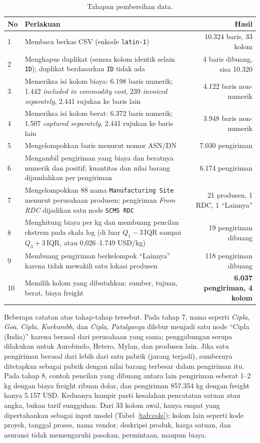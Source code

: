\documentclass[a4paper,11pt]{article}
\begin{document}
\begin{table}[tbp]
\centering\footnotesize
\caption{Tahapan pembersihan data.}\label{tab:clean}
\begin{tabular}{p{}p{}r}
\toprule
No & Perlakuan & Hasil \\ \midrule
1 & Membaca berkas CSV (enkode \texttt{latin-1}) & 10.324 baris, 33 kolom \\
2 & Menghapus duplikat (semua kolom identik selain \texttt{ID}); duplikat berdasarkan \texttt{ID} tidak ada & 4 baris dibuang, sisa 10.320 \\
3 & Memeriksa isi kolom biaya: 6.198 baris numerik; 1.442 \textit{included in commodity cost}, 239 \textit{invoiced separately}, 2.441 rujukan ke baris lain & 4.122 baris non-numerik \\
4 & Memeriksa isi kolom berat: 6.372 baris numerik; 1.507 \textit{captured separately}, 2.441 rujukan ke baris lain & 3.948 baris non-numerik \\
5 & Mengelompokkan baris menurut nomor ASN/DN & 7.030 pengiriman \\
6 & Mengambil pengiriman yang biaya dan beratnya numerik dan positif; kuantitas dan nilai barang dijumlahkan per pengiriman & 6.174 pengiriman \\
7 & Mengelompokkan 88 nama \texttt{Manufacturing Site} menurut perusahaan produsen; pengiriman \textit{From RDC} dijadikan satu node \texttt{SCMS RDC} & 21 produsen, 1 RDC, 1 ``Lainnya'' \\
8 & Menghitung biaya per kg dan membuang pencilan ekstrem pada skala log (di luar $Q_1-3\,\mathrm{IQR}$ sampai $Q_3+3\,\mathrm{IQR}$, atau 0,026--1.749 USD/kg) & 19 pengiriman dibuang \\
9 & Membuang pengiriman berkelompok ``Lainnya'' karena tidak mewakili satu lokasi produsen & 118 pengiriman dibuang \\
10 & Memilih kolom yang dibutuhkan: sumber, tujuan, berat, biaya freight & \textbf{6.037 pengiriman, 4 kolom} \\
\bottomrule
\end{tabular}
\end{table}

Beberapa catatan atas tahap-tahap tersebut. Pada tahap 7, nama seperti \textit{Cipla, Goa}, \textit{Cipla, Kurkumbh}, dan \textit{Cipla, Patalganga} dilebur menjadi satu node ``Cipla (India)'' karena berasal dari perusahaan yang sama; penggabungan serupa dilakukan untuk Aurobindo, Hetero, Mylan, dan produsen lain. Jika satu pengiriman berasal dari lebih dari satu pabrik (jarang terjadi), sumbernya ditetapkan sebagai pabrik dengan nilai barang terbesar dalam pengiriman itu. Pada tahap 8, contoh pencilan yang dibuang antara lain pengiriman seberat 1--2 kg dengan biaya freight ribuan dolar, dan pengiriman 857.354 kg dengan freight hanya 5.157 USD. Keduanya hampir pasti kesalahan pencatatan satuan atau angka, bukan tarif sungguhan. Dari 33 kolom awal, hanya empat yang dipertahankan sebagai input model (Tabel~\ref{tab:cols}); kolom lain seperti kode proyek, tanggal proses, nama vendor, deskripsi produk, harga satuan, dan asuransi tidak memengaruhi pasokan, permintaan, maupun biaya.
\end{document}
